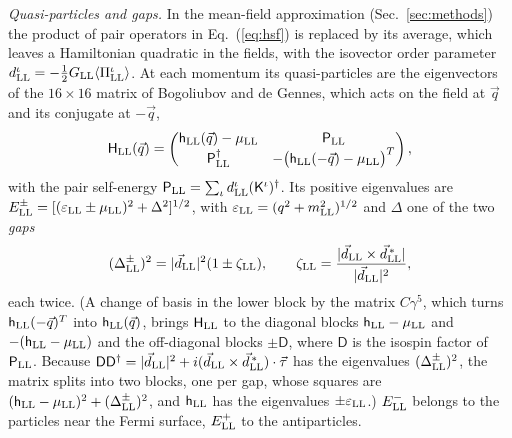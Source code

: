 \documentclass[aps,prd,twocolumn,superscriptaddress,nofootinbib,floatfix,longbibliography]{revtex4-2}
\newcommand{\LL}{{\rm LL}}
\begin{document}
\emph{Quasi-particles and gaps.} In the mean-field approximation (Sec.~\ref{sec:methods}) the product of pair
operators in Eq.~(\ref{eq:hsf}) is replaced by its average, which leaves a Hamiltonian quadratic in the fields, with the
isovector order parameter $d^\iota_\LL=-\frac12G_\LL\langle\Pi^\iota_\LL\rangle$. At each momentum its quasi-particles are
the eigenvectors of the $16\times16$ matrix of Bogoliubov and de Gennes, which acts on the field at $\vec q$ and its
conjugate at $-\vec q$,
\begin{equation}
\mathsf H_\LL(\vec q)=\begin{pmatrix}\mathsf h_\LL(\vec q)-\mu_\LL&\mathsf P_\LL\\\mathsf P_\LL^\dagger&-\big(\mathsf
h_\LL(-\vec q)-\mu_\LL\big)^T\end{pmatrix},
\label{eq:bdgLL}
\end{equation}
with the pair self-energy $\mathsf P_\LL=\sum_\iota d^\iota_\LL(\mathsf K^\iota)^\dagger$.
Its positive eigenvalues are $E^\pm_\LL=[(\varepsilon_\LL\pm\mu_\LL)^2+\Delta^2]^{1/2}$, with
$\varepsilon_\LL=(q^2+m_\LL^2)^{1/2}$ and $\Delta$ one of the two \emph{gaps}
\begin{equation}
(\Delta^\pm_\LL)^2=|\vec d_\LL|^2(1\pm\zeta_\LL),\qquad \zeta_\LL=\frac{|\vec d_\LL\times\vec d^{\,*}_\LL|}{|\vec d_\LL|^2},
\label{eq:gapsLL}
\end{equation}
each twice. (A change of basis in the lower block by the matrix $C\gamma^5$, which turns $\mathsf h_\LL(-\vec q)^T$ into
$\mathsf h_\LL(\vec q)$, brings $\mathsf H_\LL$ to the diagonal blocks $\mathsf h_\LL-\mu_\LL$ and $-(\mathsf
h_\LL-\mu_\LL)$ and the off-diagonal blocks $\pm\mathsf D$, where $\mathsf D$ is the isospin factor of $\mathsf P_\LL$.
Because $\mathsf D\mathsf D^\dagger=|\vec d_\LL|^2+i(\vec d_\LL\times\vec d^{\,*}_\LL)\cdot\vec\tau$ has the eigenvalues
$(\Delta^\pm_\LL)^2$, the matrix splits into two blocks, one per gap, whose squares are $(\mathsf
h_\LL-\mu_\LL)^2+(\Delta^\pm_\LL)^2$, and $\mathsf h_\LL$ has the eigenvalues $\pm\varepsilon_\LL$.) $E^-_\LL$ belongs to
the particles near the Fermi surface, $E^+_\LL$ to the antiparticles.
\end{document}
